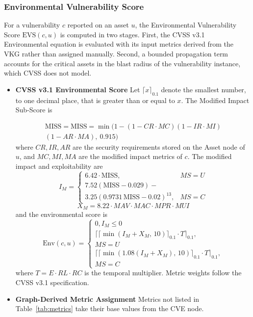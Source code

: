 \documentclass[conference]{IEEEtran}
\begin{document}
\subsubsection{\textbf{Environmental Vulnerability Score}} 

    For a vulnerability $c$ reported on an asset $u$, the Environmental
    Vulnerability Score $\mathrm{EVS}(c,u)$ is computed in two stages.
    First, the CVSS v3.1 Environmental equation is evaluated with its
    input metrics derived from the VKG rather than assigned manually.
    Second, a bounded propagation term accounts for the critical assets
    in the blast radius of the vulnerability instance, which CVSS does not model.
    \begin{itemize}
    \item{\textbf{CVSS v3.1 Environmental Score}}
    Let $\lceil x \rceil_{0.1}$ denote the smallest number, to one decimal
    place, that is greater than or equal to $x$. The Modified Impact
    Sub-Score is
    
    \begin{equation}
    \begin{aligned}
    \text{MISS} = \mathrm{MISS} = \min\!\Big(1-(1-CR\cdot MC)(1-IR\cdot MI) \\
    (1-AR\cdot MA),\ 0.915\Big)
    \end{aligned}
    \end{equation}
    where $CR, IR, AR$ are the security requirements stored on the Asset
    node of $u$, and $MC, MI, MA$ are the modified impact metrics of $c$.
    The modified impact and exploitability are
    \begin{equation}
    I_M =
    \begin{cases}
    6.42\cdot\mathrm{MISS}, & MS = U\\
    7.52(\mathrm{MISS}-0.029) - \\ 
    3.25(0.9731\,\mathrm{MISS}-0.02)^{13}, & MS = C
    \end{cases}
    \end{equation}
    \begin{equation}
    X_M = 8.22\cdot MAV\cdot MAC\cdot MPR\cdot MUI
    \end{equation}
    and the environmental score is
    \begin{equation}
    \mathrm{Env}(c,u) =
    \begin{cases}
    0, I_M \le 0\\
    \big\lceil \lceil \min(I_M + X_M,\,10)\rceil_{0.1}\cdot T \big\rceil_{0.1}, \\MS = U\\
    \big\lceil \lceil \min(1.08(I_M + X_M),\,10)\rceil_{0.1}\cdot T \big\rceil_{0.1},  \\MS = C
    \end{cases}
    \end{equation}
    where $T = E\cdot RL\cdot RC$ is the temporal multiplier. Metric weights
    follow the CVSS v3.1 specification.
    \item {\textbf{Graph-Derived Metric Assignment}}
    Metrics not listed in Table~\ref{tab:metrics} take their base values
    from the CVE node.
    

\end{itemize}
\end{document}
